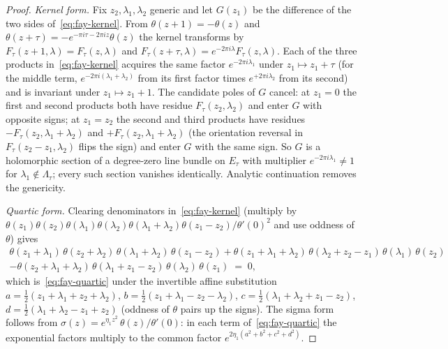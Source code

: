 \begin{proof}
\emph{Kernel form.} Fix $z_2, \lambda_1, \lambda_2$ generic and let
$G(z_1)$ be the difference of the two sides
of~\eqref{eq:fay-kernel}. From $\theta(z+1) = -\theta(z)$ and
$\theta(z+\tau) = -e^{-\pi i\tau - 2\pi i z}\theta(z)$ the kernel
transforms by $F_\tau(z+1,\lambda) = F_\tau(z,\lambda)$ and
$F_\tau(z+\tau,\lambda) = e^{-2\pi i\lambda} F_\tau(z,\lambda)$.
Each of the three products in~\eqref{eq:fay-kernel} acquires the same
factor $e^{-2\pi i\lambda_1}$ under $z_1 \mapsto z_1 + \tau$ (for the
middle term, $e^{-2\pi i(\lambda_1+\lambda_2)}$ from its first factor
times $e^{+2\pi i\lambda_2}$ from its second) and is invariant under
$z_1 \mapsto z_1 + 1$. The candidate poles of $G$ cancel: at
$z_1 = 0$ the first and second products both have residue
$F_\tau(z_2,\lambda_2)$ and enter $G$ with opposite signs; at
$z_1 = z_2$ the second and third products have residues
$-F_\tau(z_2,\lambda_1{+}\lambda_2)$ and
$+F_\tau(z_2,\lambda_1{+}\lambda_2)$ (the orientation reversal in
$F_\tau(z_2{-}z_1,\lambda_2)$ flips the sign) and enter $G$ with the
same sign. So $G$ is a holomorphic section of a degree-zero line
bundle on $E_\tau$ with multiplier $e^{-2\pi i\lambda_1} \neq 1$ for
$\lambda_1 \notin \Lambda_\tau$; every such section vanishes
identically. Analytic continuation removes the genericity.

\emph{Quartic form.} Clearing denominators in~\eqref{eq:fay-kernel}
(multiply by $\theta(z_1)\theta(z_2)\theta(\lambda_1)
\theta(\lambda_2)\theta(\lambda_1{+}\lambda_2)\theta(z_1{-}z_2)
/\theta'(0)^2$ and use oddness of $\theta$) gives
\begin{multline}\label{eq:fay-quartic-cleared}
\theta(z_1{+}\lambda_1)\,\theta(z_2{+}\lambda_2)\,
\theta(\lambda_1{+}\lambda_2)\,\theta(z_1{-}z_2)
+ \theta(z_1{+}\lambda_1{+}\lambda_2)\,
\theta(\lambda_2{+}z_2{-}z_1)\,\theta(\lambda_1)\,\theta(z_2) \\
- \theta(z_2{+}\lambda_1{+}\lambda_2)\,
\theta(\lambda_1{+}z_1{-}z_2)\,\theta(\lambda_2)\,\theta(z_1) \;=\; 0,
\end{multline}
which is~\eqref{eq:fay-quartic} under the invertible affine
substitution
$a = \tfrac{1}{2}(z_1{+}\lambda_1{+}z_2{+}\lambda_2)$,
$b = \tfrac{1}{2}(z_1{+}\lambda_1{-}z_2{-}\lambda_2)$,
$c = \tfrac{1}{2}(\lambda_1{+}\lambda_2{+}z_1{-}z_2)$,
$d = \tfrac{1}{2}(\lambda_1{+}\lambda_2{-}z_1{+}z_2)$
(oddness of $\theta$ pairs up the signs). The sigma form follows from
$\sigma(z) = e^{\eta_1 z^2}\,\theta(z)/\theta'(0)$: in each term
of~\eqref{eq:fay-quartic} the exponential factors multiply to the
common factor $e^{2\eta_1(a^2+b^2+c^2+d^2)}$.
\end{proof}

